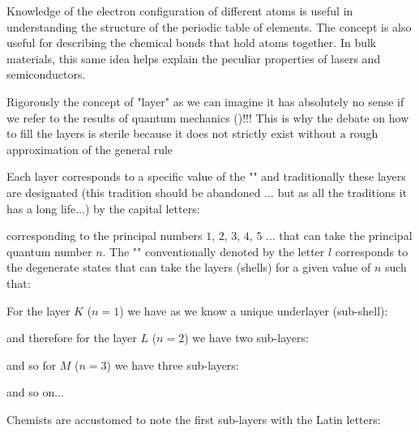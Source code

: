 	Knowledge of the electron configuration of different atoms is useful in understanding the structure of the periodic table of elements. The concept is also useful for describing the chemical bonds that hold atoms together. In bulk materials, this same idea helps explain the peculiar properties of lasers and semiconductors.
	
	\begin{tcolorbox}[title=Remark,colframe=black,arc=10pt]
		Rigorously the concept of "layer" as we can imagine it has absolutely no sense if we refer to the results of quantum mechanics ()!!! This is why the debate on how to fill the layers is sterile because it does not strictly exist without a rough approximation of the general rule
	\end{tcolorbox}
	Each layer corresponds to a specific value of the "" and traditionally these layers are designated (this tradition should be abandoned ... but as all the traditions it has a long life...) by the capital letters:
	
	corresponding to the principal numbers $1$, $2$, $3$, $4$, $5$ ... that can take the principal quantum number $n$.
	The "" conventionally denoted by the letter $l$ corresponds to the degenerate states that can take the layers (shells) for a given value of $n$ such that:

	For the layer $K$ ($n=1$) we have as we know a unique underlayer (sub-shell):
	
	and therefore for the layer $L$ ($n=2$) we have two sub-layers:
	
	and so for $M$ ($n=3$) we have three sub-layers:
	
	and so on...

	Chemists are accustomed to note the first sub-layers with the Latin letters:
	
